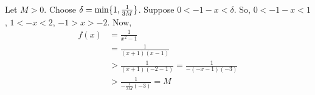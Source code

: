         Let $M > 0$.
        Choose $\delta = \min\{ 1, \frac{1}{3M} \}$.
        Suppose $0 < -1-x < \delta$.
        So, 
        $0< -1-x < 1$,
        $1< -x < 2$,
        $-1 > x > -2$.
        Now,
        \begin{align*}
            f(x) 
            &= \frac{1}{x^2 - 1}\\
            &= \frac{1}{(x+1)(x-1)}\\
            &> \frac{1}{(x+1)(-2-1)}
            = \frac{1}{-(-x-1)(-3)}\\
            &> \frac{1}{-\frac{1}{3M}(-3)}
            = M
        \end{align*}